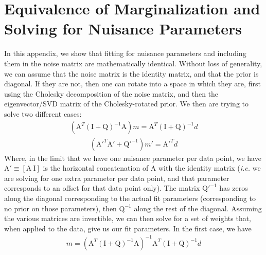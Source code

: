 \documentclass[12]{article}
\begin{document}



\appendix
\section{Equivalence of Marginalization and Solving for Nuisance Parameters}
In this appendix, we show that fitting for nuisance
parameters and including them in the noise matrix are mathematically
identical. 
Without loss of generality, we can assume that the
noise matrix is the identity matrix, and that the prior is diagonal.
If they are not, then one can rotate into a space in which they are,
first using the Cholesky decomposition of the noise matrix, and then
the eigenvector/SVD matrix of the Cholesky-rotated prior.  We then are
trying to solve two different cases:
\begin{eqnarray}
\label{eqn:data_model}
\left (\mathrm{A}^T \left (\mathrm{I+Q} \right )^{-1} \mathrm{A}
\right ) m = \mathrm{A}^T\left (\mathrm{I+Q} \right )^{-1} d
\end{eqnarray}
\begin{eqnarray}
\left (\mathrm{A'}^T  \mathrm{A'} +\mathrm{Q'}^{-1} \right ) m' = \mathrm{A'}^T  d
\end{eqnarray}
Where, in the limit that we have one nuisance parameter per data
point, we have $\mathrm{A}' \equiv \left [\mathrm{A}\ \mathrm{I}\right ]$
 is the horizontal concatenation of
$\mathrm{A}$ with the identity matrix ({\textit{i.e.}} we are solving
for one extra parameter per data point, and that parameter corresponds
to an offset for that data point only).  The matrix $\mathrm{Q}'^{-1}$
has zeros along the diagonal corresponding to the actual fit
parameters (corresponding to no prior on those parameters), then
$\mathrm{Q}^{-1}$ along the rest of the diagonal.  Assuming the
various matrices are invertible, we can then solve
for a set of weights that, when applied to the data, give us our fit
parameters. In the first case, we have 
\begin{eqnarray}
m=\left (\mathrm{A}^T \left (\mathrm{I+Q} \right )^{-1}
\mathrm{A}\right )^{-1}\mathrm{A}^T\left (\mathrm{I+Q} \right )^{-1}d
\end{eqnarray}
\end{document}
